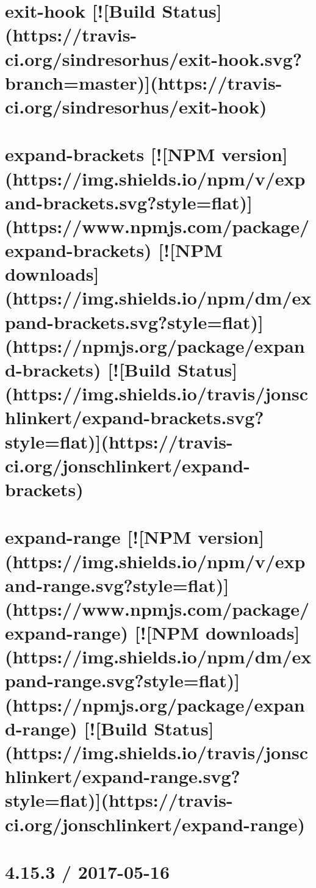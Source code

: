 \documentclass[twoside]{book}
\newcommand{\+}{\discretionary{\mbox{\scriptsize$\hookleftarrow$}}{}{}}
\begin{document}
\chapter{exit-\/hook \mbox{[}!\mbox{[}Build Status\mbox{]}(https\+://travis-\/ci.org/sindresorhus/exit-\/hook.svg?branch=master)\mbox{]}(https\+://travis-\/ci.org/sindresorhus/exit-\/hook)}
\label{md__c_1_workspace_demo_src_main_script_node_modules_exit-hook_readme}

\chapter{expand-\/brackets \mbox{[}!\mbox{[}N\+PM version\mbox{]}(https\+://img.shields.\+io/npm/v/expand-\/brackets.svg?style=flat)\mbox{]}(https\+://www.npmjs.\+com/package/expand-\/brackets) \mbox{[}!\mbox{[}N\+PM downloads\mbox{]}(https\+://img.shields.\+io/npm/dm/expand-\/brackets.svg?style=flat)\mbox{]}(https\+://npmjs.org/package/expand-\/brackets) \mbox{[}!\mbox{[}Build Status\mbox{]}(https\+://img.shields.\+io/travis/jonschlinkert/expand-\/brackets.svg?style=flat)\mbox{]}(https\+://travis-\/ci.org/jonschlinkert/expand-\/brackets)}
\label{md__c_1_workspace_demo_src_main_script_node_modules_expand-brackets__r_e_a_d_m_e}

\chapter{expand-\/range \mbox{[}!\mbox{[}N\+PM version\mbox{]}(https\+://img.shields.\+io/npm/v/expand-\/range.svg?style=flat)\mbox{]}(https\+://www.npmjs.\+com/package/expand-\/range) \mbox{[}!\mbox{[}N\+PM downloads\mbox{]}(https\+://img.shields.\+io/npm/dm/expand-\/range.svg?style=flat)\mbox{]}(https\+://npmjs.org/package/expand-\/range) \mbox{[}!\mbox{[}Build Status\mbox{]}(https\+://img.shields.\+io/travis/jonschlinkert/expand-\/range.svg?style=flat)\mbox{]}(https\+://travis-\/ci.org/jonschlinkert/expand-\/range)}
\label{md__c_1_workspace_demo_src_main_script_node_modules_expand-range__r_e_a_d_m_e}

\chapter{4.15.3 / 2017-\/05-\/16}
\label{md__c_1_workspace_demo_src_main_script_node_modules_express__history}

\end{document}
